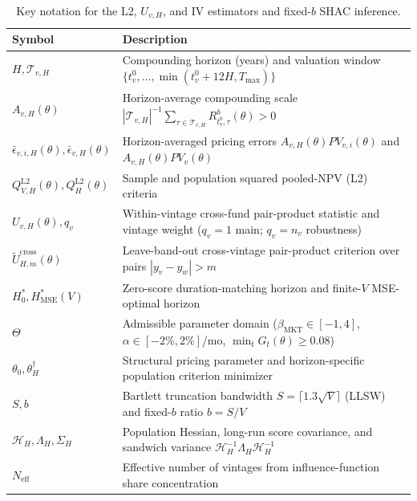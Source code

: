 \begin{table}[htbp]
	\centering
	\small
	\begin{tabularx}{\textwidth}{@{}lX@{}}
		\toprule
		Symbol & Description \\
		\midrule
		$H, \mathcal{T}_{v,H}$ & Compounding horizon (years) and valuation window $\{t_v^0,\dots,\min(t_v^0+12H, T_{\max})\}$ \\
		$A_{v,H}(\theta)$ & Horizon-average compounding scale $|\mathcal{T}_{v,H}|^{-1}\sum_{\tau\in\mathcal{T}_{v,H}} R^b_{t_v^0,\tau}(\theta) > 0$ \\
		$\bar\epsilon_{v,i,H}(\theta), \bar\epsilon_{v,H}(\theta)$ & Horizon-averaged pricing errors $A_{v,H}(\theta) PV_{v,i}(\theta)$ and $A_{v,H}(\theta) PV_v(\theta)$ \\
		$Q_{V,H}^{\mathrm{L2}}(\theta), Q_H^{\mathrm{L2}}(\theta)$ & Sample and population squared pooled-NPV (L2) criteria \\
		$U_{v,H}(\theta), q_v$ & Within-vintage cross-fund pair-product statistic and vintage weight ($q_v=1$ main; $q_v=n_v$ robustness) \\
		$\widetilde{U}_{H,m}^{\mathrm{cross}}(\theta)$ & Leave-band-out cross-vintage pair-product criterion over pairs $|y_v - y_w| > m$ \\
		$H_0^\ast, H_{\mathrm{MSE}}^\ast(V)$ & Zero-score duration-matching horizon and finite-$V$ MSE-optimal horizon \\
		$\Theta$ & Admissible parameter domain ($\beta_{\mathrm{MKT}}\in[-1,4]$, $\alpha\in[-2\%,2\%]$/mo, $\min_t G_t(\theta)\ge 0.08$) \\
		$\theta_0, \theta_H^\dagger$ & Structural pricing parameter and horizon-specific population criterion minimizer \\
		$S, b$ & Bartlett truncation bandwidth $S = \lceil 1.3\sqrt{V}\rceil$ (LLSW) and fixed-$b$ ratio $b = S/V$ \\
		$\mathcal{H}_H, \Lambda_H, \Sigma_H$ & Population Hessian, long-run score covariance, and sandwich variance $\mathcal{H}_H^{-1}\Lambda_H\mathcal{H}_H^{-1}$ \\
		$N_{\mathrm{eff}}$ & Effective number of vintages from influence-function share concentration \\
		\bottomrule
	\end{tabularx}
	\caption{Key notation for the L2, $U_{v,H}$, and IV estimators and fixed-$b$ SHAC inference.}
	\label{tab:notation_estimator}
\end{table}



